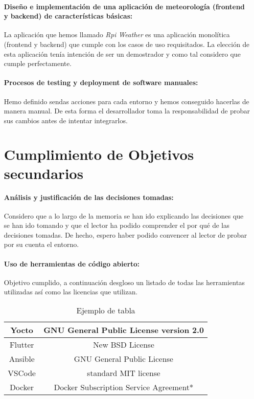 \paragraph{\checkmark Diseño e implementación de una aplicación de meteorología (frontend y
backend) de características básicas:} La aplicación que hemos llamado \emph{Rpi Weather}
es una aplicación monolítica (frontend y backend) que cumple con los casos de uso
requisitados. La elección de esta aplicación tenía intención de ser un demostrador y
como tal considero que cumple perfectamente.

\paragraph{\checkmark Procesos de testing y deployment de software manuales:}Hemo definido
sendas acciones para cada entorno y hemos conseguido hacerlas de manera manual. De esta
forma el desarrollador toma la responsabilidad de probar sus cambios antes de intentar
integrarlos.

\section{Cumplimiento de Objetivos secundarios}

\paragraph{\checkmark Análisis y justificación de las decisiones tomadas:}Considero que
a lo largo de la memoria se han ido explicando las decisiones que se han ido tomando y
que el lector ha podido comprender el por qué de las decisiones tomadas. De hecho, espero
haber podido convencer al lector de probar por su cuenta el entorno.

\paragraph{\checkmark Uso de herramientas de código abierto:} Objetivo cumplido, a continuación
desgloso un listado de todas las herramientas utilizadas así como las licencias que
utilizan.

\begin{table}[H]
    \begin{center}
    \begin{tabular}{|c|c|}
    \hline
    Yocto & GNU General Public License version 2.0 \\
    \hline
    Flutter & New BSD License \\
    \hline
    Ansible & GNU General Public License \\
    \hline
    VSCode & standard MIT license \\
    \hline
    Docker &  Docker Subscription Service Agreement* \\
    \hline
    \end{tabular}
    \end{center}
    \caption{Ejemplo de tabla}\label{tab:table_example}
\end{table}

